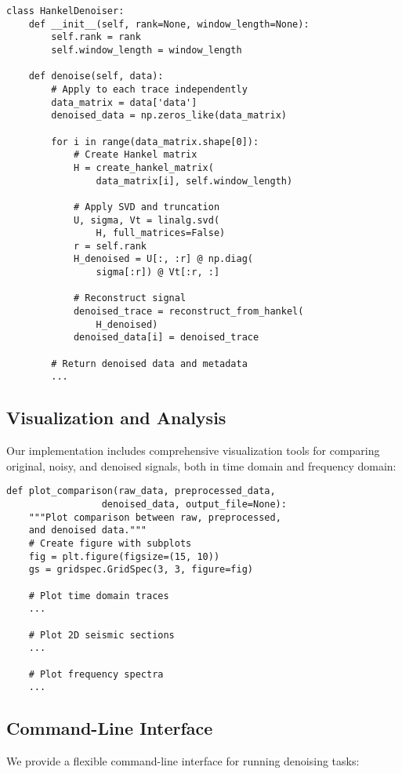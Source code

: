 \documentclass[10pt,twocolumn]{article}
\begin{document}
\begin{lstlisting}
class HankelDenoiser:
    def __init__(self, rank=None, window_length=None):
        self.rank = rank
        self.window_length = window_length
    
    def denoise(self, data):
        # Apply to each trace independently
        data_matrix = data['data']
        denoised_data = np.zeros_like(data_matrix)
        
        for i in range(data_matrix.shape[0]):
            # Create Hankel matrix
            H = create_hankel_matrix(
                data_matrix[i], self.window_length)
            
            # Apply SVD and truncation
            U, sigma, Vt = linalg.svd(
                H, full_matrices=False)
            r = self.rank
            H_denoised = U[:, :r] @ np.diag(
                sigma[:r]) @ Vt[:r, :]
            
            # Reconstruct signal
            denoised_trace = reconstruct_from_hankel(
                H_denoised)
            denoised_data[i] = denoised_trace
        
        # Return denoised data and metadata
        ...
\end{lstlisting}

\subsection{Visualization and Analysis}
Our implementation includes comprehensive visualization tools for comparing original, noisy, and denoised signals, both in time domain and frequency domain:

\begin{lstlisting}
def plot_comparison(raw_data, preprocessed_data, 
                 denoised_data, output_file=None):
    """Plot comparison between raw, preprocessed, 
    and denoised data."""
    # Create figure with subplots
    fig = plt.figure(figsize=(15, 10))
    gs = gridspec.GridSpec(3, 3, figure=fig)
    
    # Plot time domain traces
    ...
    
    # Plot 2D seismic sections
    ...
    
    # Plot frequency spectra
    ...
\end{lstlisting}

\subsection{Command-Line Interface}
We provide a flexible command-line interface for running denoising tasks:
\end{document}
